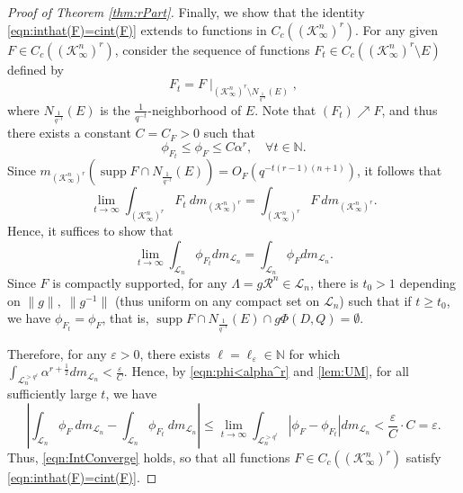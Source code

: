 \documentclass[11pt,a4paper,reqno]{amsart}
\theoremstyle{definition}
\theoremstyle{remark}
\numberwithin{equation}{section}
\DeclareMathOperator{\supp}{supp}
\begin{document}
\begin{proof}[Proof of Theorem \ref{thm:rPart}]
\vspace{0.1in}
    Finally, we show that the identity \eqref{eqn:inthat(F)=cint(F)} extends to functions in $C_c\left((\mathcal K^n_\infty)^r\right)$. 
For any given $F\in C_c\left((\mathcal K^n_\infty)^{r}\right)$, consider the sequence of functions $F_t \in C_c\left((\mathcal K^n_\infty)^{r}\setminus E\right)$ defined by
\[
F_t=F\mid^{}_{(\mathcal K_\infty^n)^r\setminus N_{\frac 1 {q^{-t}}}(E)},
\]
where $N_{\frac 1 {q^{-t}}}(E)$ is the $\frac 1 {q^{-t}}$-neighborhood of $E$.
Note that $(F_t)\nearrow F$, and thus there exists a constant $C=C_F>0$ such that
\begin{equation}\label{eqn:phi<alpha^r}
\phi_{F_t}\le \phi_F\le C\alpha^r, \quad\forall t\in \mathbb N.\end{equation}
Since $m_{(\mathcal K_\infty^n)^r} (\supp F \cap N_{\frac 1 {q^{-t}}}(E))=O_F(q^{-t(r-1)(n+1)})$, it follows that
\[
\lim_{t\rightarrow \infty} \int_{(\mathcal K_\infty^n)^r} F_t \: dm_{(\mathcal K_\infty^n)^r}=\int_{(\mathcal K_\infty^n)^r} F\: dm_{(\mathcal K_\infty^n)^r}.
\]
Hence, it suffices to show that \begin{equation}\label{eqn:IntConverge}\lim_{t\rightarrow \infty}\int_{\mathcal L_n} \phi_{F_t} dm_{\mathcal L_n}=\int_{\mathcal L_n} \phi_{F} dm_{\mathcal L_n}.\end{equation}
Since $F$ is compactly supported, for any $\Lambda=g\mathcal R^n\in \mathcal L_n$, there is $t_0>1$ depending on $\|g\|,\;\|g^{-1}\|$ (thus uniform on any compact set on $\mathcal L_n$) such that if $t\ge t_0$, we have $\phi_{F_t}=\phi_F$, that is, $\supp F \cap N_{\frac 1 {q^{-t}}}(E) \cap g\Phi(D,Q)=\emptyset$. 

Therefore, for any $\varepsilon>0$, there exists $\ell=\ell_{\varepsilon}\in \mathbb N$ for which $\int_{\mathcal L_n^{> q^{\ell}}} \alpha^{r+\frac 1 2} dm_{\mathcal L_n}<\frac \varepsilon {C}$. Hence, by \eqref{eqn:phi<alpha^r} and \eqref{lem:UM}, for all sufficiently large $t$, we have
\[
\left|\int_{\mathcal L_n} \phi_F \: dm_{\mathcal L_n} -\int_{\mathcal L_n} \phi_{F_t} \: dm_{\mathcal L_n}\right|\leq \lim_{t\rightarrow \infty} \int_{\mathcal L_n^{> q^{\ell}}} \left|\phi_F- \phi_{F_t}\right| dm_{\mathcal L_n} <\frac{\varepsilon}{C}\cdot C=\varepsilon.
\]
Thus, \eqref{eqn:IntConverge} holds, so that all functions $F\in C_c((\mathcal{K}_{\infty}^n)^r)$ satisfy \eqref{eqn:inthat(F)=cint(F)}. 
\end{proof}
\end{document}
